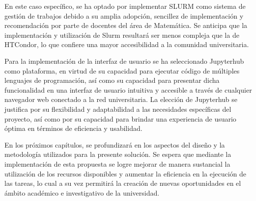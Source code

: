 \begin{spacing}{1.5}
  En este caso específico, se ha optado por implementar SLURM como sistema de gestión de trabajos debido a su amplia adopción, sencillez de implementación y recomendación por parte de docentes del área de Matemática. Se anticipa que la implementación y utilización de Slurm resultará ser menos compleja que la de HTCondor, lo que confiere una mayor accesibilidad a la comunidad universitaria.

  Para la implementación de la interfaz de usuario se ha seleccionado Jupyterhub como plataforma, en virtud de su capacidad para ejecutar código de múltiples lenguajes de programación, así como su capacidad para presentar dicha funcionalidad en una interfaz de usuario intuitiva y accesible a través de cualquier navegador web conectado a la red universitaria. La elección de Jupyterhub se justifica por su flexibilidad y adaptabilidad a las necesidades específicas del proyecto, así como por su capacidad para brindar una experiencia de usuario óptima en términos de eficiencia y usabilidad.

  En los próximos capítulos, se profundizará en los aspectos del diseño y la metodología utilizados para la presente solución. Se espera que mediante la implementación de esta propuesta se logre mejorar de manera sustancial la utilización de los recursos disponibles y aumentar la eficiencia en la ejecución de las tareas, lo cual a su vez permitirá la creación de nuevas oportunidades en el ámbito académico e investigativo de la universidad.

  \mylinespacing
  \mylinespacing
  \begin{tightcenter}
  \end{tightcenter}
\end{spacing}